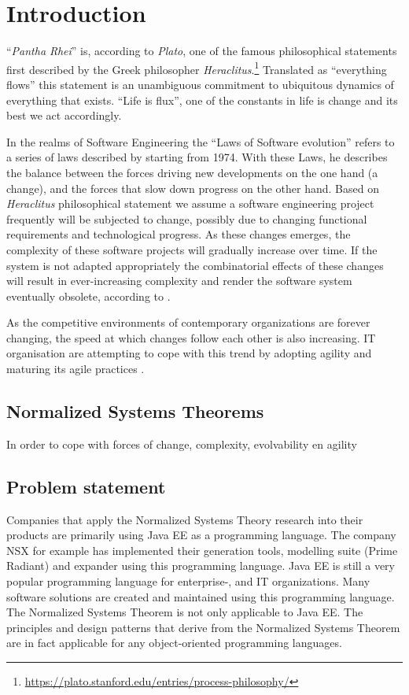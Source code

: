 \chapter{Introduction} \label{introduction}

\enquote{\emph{Pantha Rhei}} is, according to \emph{Plato}, one of the famous
philosophical statements first described by the Greek philosopher
\emph{Heraclitus}.\footnote[1]{\url{https://plato.stanford.edu/entries/process-philosophy/}}
Translated as \enquote{everything flows} this statement is an unambiguous commitment to
ubiquitous dynamics of everything that exists. \enquote{Life is flux}, one of the
constants in life is change and its best we act accordingly.  

In the realms of Software Engineering the \enquote{Laws of Software evolution} refers to a
series of laws described by \citeauthor{lehman_programs_1980} starting from 1974. With
these Laws, he describes the balance between the forces driving new developments on the
one hand (a change), and the forces that slow down progress on the other hand. Based on
\emph{Heraclitus} philosophical statement we assume a software engineering project
frequently will be subjected to change, possibly due to changing functional requirements
and technological progress. As these changes emerges, the complexity of these software
projects will gradually increase over time. If the system is not adapted appropriately the
combinatorial effects of these changes will result in ever-increasing complexity and
render the software system eventually obsolete, according to
\citeauthor{lehman_programs_1980} \parencite*[]{lehman_programs_1980}.

As the competitive environments of contemporary organizations are forever changing, the
speed at which changes follow each other is also increasing. IT organisation are
attempting to cope with this trend by adopting agility and maturing its agile practices
\parencite*[]{WOS:000346152700004}.

\section{Normalized Systems Theorems}
In order to cope with forces of change, complexity, evolvability en agility 

\section{Problem statement} \label{problem_statement}
Companies that apply the Normalized Systems Theory research into their products are
primarily using Java EE as a programming language. The company NSX for example has
implemented their generation tools, modelling suite (Prime Radiant) and expander using
this programming language. Java EE is still a very popular programming language for
enterprise-, and IT organizations. Many software solutions are created and maintained
using this programming language. The Normalized Systems Theorem is not only applicable to
Java EE. The principles and design patterns that derive from the Normalized Systems
Theorem are in fact applicable for any object-oriented programming languages. 

